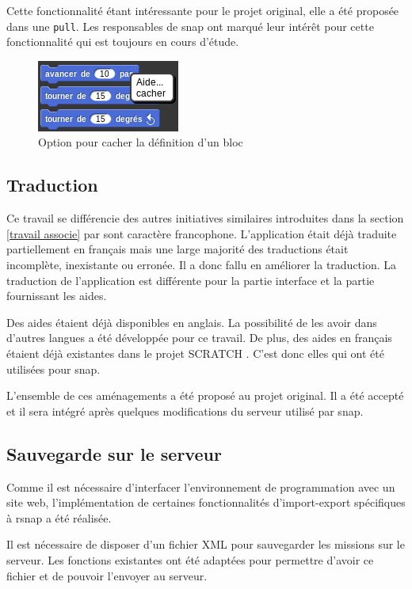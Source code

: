 Cette fonctionnalité étant intéressante pour le projet original, elle a été proposée dans une \texttt{\gls{pull}}. Les responsables de \gls{snap} ont marqué leur intérêt pour cette fonctionnalité qui est toujours en cours d'étude.
\begin{figure}
  \begin{center}
    \includegraphics[scale=0.5]{content/7-solution/2-snap/images/cacher}
    \caption{Option pour cacher la définition d'un bloc}
    \label{fig:cacher}
  \end{center}
\end{figure}

\subsection{Traduction}
Ce travail se différencie des autres initiatives similaires introduites dans la section \ref{travail associe} par sont caractère francophone. L'application était déjà traduite partiellement en français mais une large majorité des traductions était incomplète, inexistante ou erronée. Il a donc fallu en améliorer la traduction. La traduction de l'application est différente pour la partie interface et la partie fournissant les aides.

Des aides étaient déjà disponibles en anglais. La possibilité de les avoir dans d'autres langues a été développée pour ce travail. De plus, des aides en français étaient déjà existantes dans le projet SCRATCH \cite{scratch-translation}. C'est donc elles qui ont été utilisées pour \gls{snap}.

L'ensemble de ces aménagements a été proposé au projet original. Il a été accepté et il sera intégré après quelques modifications du serveur utilisé par \gls{snap}.

\subsection{Sauvegarde sur le serveur}
Comme il est nécessaire d'interfacer l'environnement de programmation avec un site web, l'implémentation de certaines fonctionnalités d'import-export spécifiques à \gls{rsnap} a été réalisée.

Il est nécessaire de disposer d'un fichier XML pour sauvegarder les \glspl{mission} sur le serveur. Les fonctions existantes ont été adaptées pour permettre d'avoir ce fichier et de pouvoir l'envoyer au serveur.
